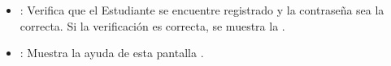 \begin{itemize}
	\item {}: Verifica que el Estudiante se encuentre registrado y la contraseña sea la correcta. Si la verificación es correcta, se muestra la .
	\item {}: Muestra la ayuda de esta pantalla .
\end{itemize}

